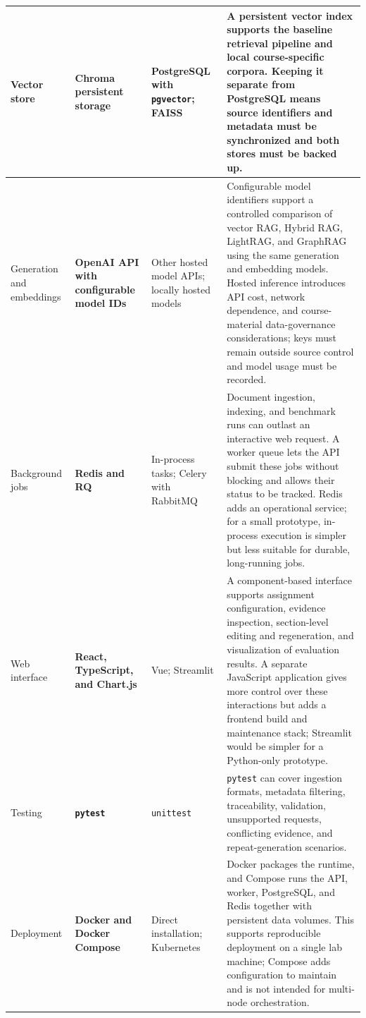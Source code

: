 \documentclass[12pt,a4paper]{article}
\begin{document}
\begin{xltabular}{\textwidth}{
    |p{25mm}|p{38mm}|p{34mm}|X|
}
Vector store &
\textbf{Chroma persistent storage} &
PostgreSQL with \texttt{pgvector}; FAISS &
A persistent vector index supports the baseline retrieval pipeline
and local course-specific corpora. Keeping it separate from
PostgreSQL means source identifiers and metadata must be
synchronized and both stores must be backed up. \\
\hline

Generation and embeddings &
\textbf{OpenAI API with configurable model IDs} &
Other hosted model APIs; locally hosted models &
Configurable model identifiers support a controlled comparison of
vector RAG, Hybrid RAG, LightRAG, and GraphRAG using the same
generation and embedding models.
Hosted inference introduces API cost, network dependence, and
course-material data-governance considerations; keys must remain
outside source control and model usage must be recorded. \\
\hline

Background jobs &
\textbf{Redis and RQ} &
In-process tasks; Celery with RabbitMQ &
Document ingestion, indexing, and benchmark runs can outlast an
interactive web request. A worker queue lets the API submit these
jobs without blocking and allows their status to be tracked. Redis
adds an operational service; for a small prototype, in-process
execution is simpler but less suitable for durable, long-running
jobs. \\
\hline

Web interface &
\textbf{React, TypeScript, and Chart.js} &
Vue; Streamlit &
A component-based interface supports assignment configuration,
evidence inspection, section-level editing and regeneration, and
visualization of evaluation results. A separate JavaScript
application gives more control over these interactions but adds a
frontend build and maintenance stack; Streamlit would be simpler
for a Python-only prototype. \\
\hline

Testing &
\textbf{\texttt{pytest}} &
\texttt{unittest} &
\texttt{pytest} can cover ingestion formats, metadata filtering, traceability,
validation, unsupported requests, conflicting evidence, and
repeat-generation scenarios. \\
\hline

Deployment &
\textbf{Docker and Docker Compose} &
Direct installation; Kubernetes &
Docker packages the runtime, and Compose runs the API, worker,
PostgreSQL, and Redis together with persistent data volumes.
This supports reproducible deployment on a single lab machine;
Compose adds configuration to maintain and is not intended for
multi-node orchestration. \\
\hline

\end{xltabular}
\endgroup
\end{document}
